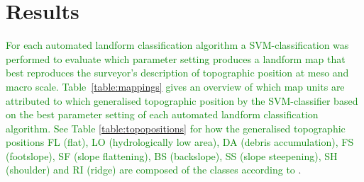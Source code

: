 \documentclass[preprint,12pt,authoryear]{elsarticle}
\begin{document}
\section{Results}
\textcolor{green}{For each automated landform classification algorithm a SVM-classification was performed to evaluate which parameter setting produces a landform map that best reproduces the surveyor's description of topographic position at meso and macro scale.  Table~}\ref{table:mappings} \textcolor{green}{gives an overview of which map units are attributed to which generalised  topographic position by the SVM-classifier based on the best parameter setting of each automated landform classification algorithm. See Table} \ref{table:topopositions} \textcolor{green}{for how the generalised topographic positions  FL (flat), LO (hydrologically low area), DA (debris accumulation), FS (footslope), SF (slope flattening), BS (backslope), SS (slope steepening), SH (shoulder) and RI (ridge) are composed of the classes  according to} \cite{Englisch1998}.
\end{document}
